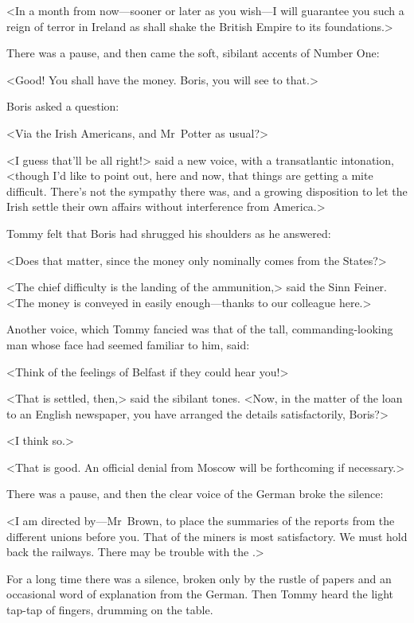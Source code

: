 <In a month from now—sooner or later as you wish—I will guarantee you such a reign of terror in Ireland as shall shake the British Empire to its foundations.>

There was a pause, and then came the soft, sibilant accents of Number One:

<Good! You shall have the money. Boris, you will see to that.>

Boris asked a question:

<Via the Irish Americans, and Mr~Potter as usual?>

<I guess that'll be all right!> said a new voice, with a transatlantic intonation, <though I'd like to point out, here and now, that things are getting a mite difficult. There's not the sympathy there was, and a growing disposition to let the Irish settle their own affairs without interference from America.>

Tommy felt that Boris had shrugged his shoulders as he answered:

<Does that matter, since the money only nominally comes from the States?>

<The chief difficulty is the landing of the ammunition,> said the Sinn Feiner. <The money is conveyed in easily enough—thanks to our colleague here.>

Another voice, which Tommy fancied was that of the tall, commanding-looking man whose face had seemed familiar to him, said:

<Think of the feelings of Belfast if they could hear you!>

<That is settled, then,> said the sibilant tones. <Now, in the matter of the loan to an English newspaper, you have arranged the details satisfactorily, Boris?>

<I think so.>

<That is good. An official denial from Moscow will be forthcoming if necessary.>

There was a pause, and then the clear voice of the German broke the silence:

<I am directed by—Mr~Brown, to place the summaries of the reports from the different unions before you. That of the miners is most satisfactory. We must hold back the railways. There may be trouble with the .>

For a long time there was a silence, broken only by the rustle of papers and an occasional word of explanation from the German. Then Tommy heard the light tap-tap of fingers, drumming on the table.


